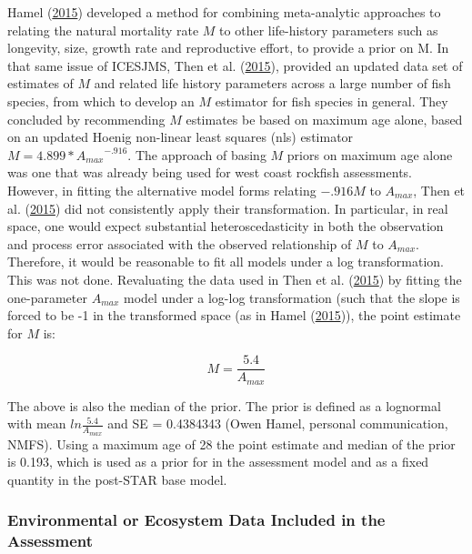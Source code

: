 \documentclass[12pt,]{article}
\begin{document}
Hamel (\protect\hyperlink{ref-Hamel2015}{2015}) developed a method for
combining meta-analytic approaches to relating the natural mortality
rate \(M\) to other life-history parameters such as longevity, size,
growth rate and reproductive effort, to provide a prior on M. In that
same issue of ICESJMS, Then et al.
(\protect\hyperlink{ref-Then2015}{2015}), provided an updated data set
of estimates of \(M\) and related life history parameters across a large
number of fish species, from which to develop an \(M\) estimator for
fish species in general. They concluded by recommending \(M\) estimates
be based on maximum age alone, based on an updated Hoenig non-linear
least squares (nls) estimator \(M= 4.899*{A_{max}}^{-.916}\). The
approach of basing \(M\) priors on maximum age alone was one that was
already being used for west coast rockfish assessments. However, in
fitting the alternative model forms relating \(-.916M\) to \(A_{max}\),
Then et al. (\protect\hyperlink{ref-Then2015}{2015}) did not
consistently apply their transformation. In particular, in real space,
one would expect substantial heteroscedasticity in both the observation
and process error associated with the observed relationship of \(M\) to
\(A_{max}\). Therefore, it would be reasonable to fit all models under a
log transformation. This was not done. Revaluating the data used in Then
et al. (\protect\hyperlink{ref-Then2015}{2015}) by fitting the
one-parameter \(A_{max}\) model under a log-log transformation (such
that the slope is forced to be -1 in the transformed space (as in Hamel
(\protect\hyperlink{ref-Hamel2015}{2015})), the point estimate for \(M\)
is:

\begin{equation}
M = \frac{5.4}{A_{max}}
\end{equation}

The above is also the median of the prior. The prior is defined as a
lognormal with mean \(ln\frac{5.4}{A_{max}}\) and SE = 0.4384343 (Owen
Hamel, personal communication, NMFS). Using a maximum age of 28 the
point estimate and median of the prior is 0.193, which is used as a
prior for in the assessment model and as a fixed quantity in the
post-STAR base model.

\vspace{.5cm}

\subsubsection{Environmental or Ecosystem Data Included in the
Assessment}\label{environmental-or-ecosystem-data-included-in-the-assessment}
\end{document}
